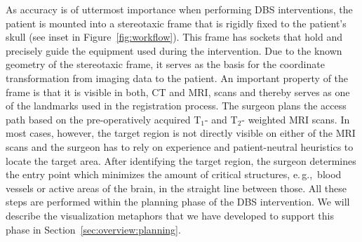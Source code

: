 \documentclass[review]{vgtc}                 %
\begin{document}
%
%
As accuracy is of uttermost importance when performing DBS interventions, the patient is mounted into a stereotaxic frame that is rigidly fixed to the patient's skull (see inset in Figure~\ref{fig:workflow}). This frame has sockets that hold and precisely guide the equipment used during the intervention. Due to the known geometry of the stereotaxic frame, it serves as the basis for the coordinate transformation from imaging data to the patient. An important property of the frame is that it is visible in both, CT and MRI, scans and thereby serves as one of the landmarks used in the registration process. The surgeon plans the access path based on the pre-operatively acquired T$_1$- and T$_2$- weighted MRI scans. In most cases, however, the target region is not directly visible on either of the MRI scans and the surgeon has to rely on experience and patient-neutral heuristics to locate the target area. After identifying the target region, the surgeon determines the entry point which minimizes the amount of critical structures, e.\,g.,~blood vessels or active areas of the brain, in the straight line between those. All these steps are performed within the planning phase of the DBS intervention. We will describe the visualization metaphors that we have developed to support this phase in Section~\ref{sec:overview:planning}.
\end{document}
